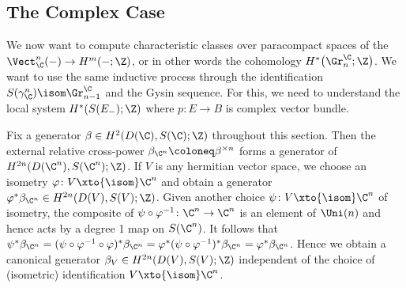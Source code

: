 \subsection{The Complex Case}
We now want to compute characteristic classes over paracompact spaces of the $\Vect_\C^n({{-}}) \to H^m({{-}}; \Z)$, or in other words the cohomology $H^*\big(\Gr^\C_n; \Z\big)$.
We want to use the same inductive process through the identification $S(\gamma_\C^n) \isom \Gr^\C_{n - 1}$ and the Gysin sequence.
For this, we need to understand the local system $H^*(S(E_{-}); \Z)$ where $p\colon E \to B$ is complex vector bundle.

Fix a generator $\beta \in H^2(D(\C), S(\C); \Z)$ throughout this section.
Then the external relative cross-power $\beta_{\C^n} \coloneq \beta^{\times n}$ forms a generator of $H^{2n}(D(\C^n), S(\C^n); \Z)$.
If $V$ is any hermitian vector space, we choose an isometry $\varphi\colon V \xto{\isom} \C^n$ and obtain a generator $\varphi^* \beta_{\C^n} \in H^{2n}(D(V), S(V); \Z)$.
Given another choice $\psi\colon V \xto{\isom} \C^n$ of isometry, the composite of $\psi \circ \varphi^{-1}\colon \C^n \to \C^n$ is an element of $\Uni(n)$ and hence acts by a degree 1 map on $S(\C^n)$.
It follows that $\psi^* \beta_{\C^n} = (\psi \circ \varphi^{-1} \circ \varphi)^* \beta_{\C^n} = \varphi^* (\psi \circ \varphi^{-1})^* \beta_{\C^n} = \varphi^* \beta_{\C^n}$.
Hence we obtain a canonical generator $\beta_V \in H^{2n}(D(V), S(V); \Z)$ independent of the choice of (isometric) identification $V \xto{\isom} \C^n$.

